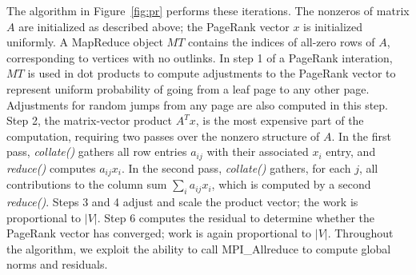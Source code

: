 The algorithm in Figure~\ref{fig:pr} performs these
iterations.  The nonzeros of matrix $A$ are initialized as described above;
the PageRank vector $x$ is initialized uniformly.  A MapReduce object $MT$
contains the indices of all-zero rows of $A$, corresponding to vertices
with no outlinks.  In step 1 of a PageRank interation, $MT$ is used 
in dot products to compute adjustments to the
PageRank vector to represent uniform probability of going from a leaf page
to any other page.  Adjustments for random jumps from any page are also
computed in this step.  Step 2, the matrix-vector product $A^T x$, is the most
expensive part of the computation, requiring two passes over the nonzero
structure of $A$.  In the first pass, {\it collate()} 
gathers all row entries $a_{ij}$ with their
associated $x_i$ entry, and {\it reduce()} computes $a_{ij} x_i$.  
In the second pass, 
{\it collate()} gathers, for each $j$, all contributions to the
column sum $\sum_i a_{ij} x_i$, which is computed by a second {\it reduce()}. 
Steps 3 and 4 adjust and scale the 
product vector; the work is proportional to $|V|$.  Step 6 computes the
residual to determine whether the PageRank vector has converged; work is
again proportional to $|V|$.  Throughout the algorithm, we exploit the
ability to call MPI\_Allreduce to compute global norms and residuals. 

